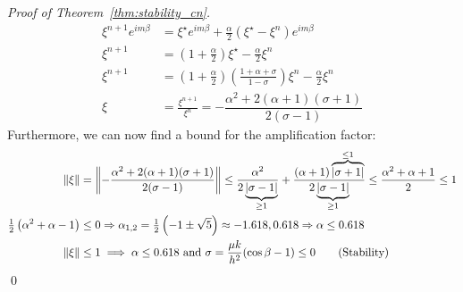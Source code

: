 \begin{proof}[Proof of Theorem~\ref{thm:stability_cn}]
\begin{align*}
    \xi^{n+1} e^{i m \beta} & = \xi^\star e^{i m \beta} + \tfrac{\alpha}{2}(\xi^\star - \xi^n)e^{i m \beta}                                           \\
    \xi^{n+1}               & = (1 + \tfrac{\alpha}{2}) \xi^\star - \tfrac{\alpha}{2} \xi^n                                                           \\
    \xi^{n+1}               & = \left(1 + \tfrac{\alpha}{2}\right)\left(\tfrac{1 + \alpha + \sigma}{1 - \sigma}\right)\xi^n - \tfrac{\alpha}{2} \xi^n \\
    \xi                     & = \tfrac{\xi^{n+1}}{\xi^n} = -\dfrac{\alpha^2 + 2(\alpha + 1) (\sigma + 1)}{2 (\sigma - 1)} \tag{Source: Trust me bro}
  \end{align*}
  Furthermore, we can now find a bound for the amplification factor:
  \begin{align*}
    \norm*{\xi}                                    & = \norm*{-\dfrac{\alpha^2 + 2(\alpha + 1)(\sigma + 1)}{2(\sigma - 1)}} \leq \dfrac{\alpha^2}{2\underbrace{\abs*{\sigma - 1}}_{\geq 1}} + \dfrac{(\alpha + 1)\overbrace{\abs*{\sigma + 1}}^{\leq 1}}{2\underbrace{\abs{\sigma - 1}}_{\geq 1}} \leq \dfrac{\alpha^2+ \alpha + 1}{2} \leq 1 \\
    \tfrac{1}{2}\left(\alpha^2 + \alpha - 1\right) & \leq 0 \Rightarrow \alpha_{1,2} = \tfrac{1}{2}\left(-1 \pm \sqrt{5}\right) \approx -1.618, 0.618 \Rightarrow \alpha \leq 0.618\\
    \norm*{\xi}                                    & \leq 1 \implies \alpha \leq 0.618 \text{ and } \sigma = \frac{\mu k}{h^2}(\cos\beta - 1) \leq 0 \tag{Stability} 
  \end{align*}\qed
\end{proof}


